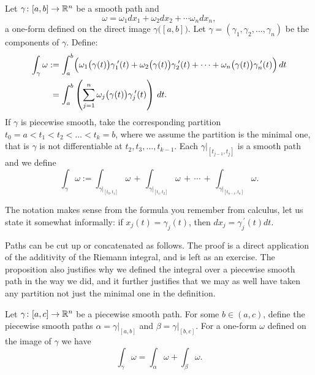 \begin{defn}
Let $\gamma \colon [a,b] \to {\mathbb{R}}^n$ be a smooth path
and
\begin{equation*}
\omega = \omega_1 dx_1 + \omega_2 dx_2 + \cdots \omega_n dx_n ,
\end{equation*}
a one-form defined on the direct image $\gamma\bigl([a,b]\bigr)$.
Let $\gamma = (\gamma_1,\gamma_2,\ldots,\gamma_n)$ be the components of
$\gamma$.
Define:
\begin{equation*}
\begin{split}
\int_{\gamma} \omega
& :=
\int_a^b 
\Bigl(
\omega_1\bigl(\gamma(t)\bigr) \gamma_1^{\:\prime}(t) +
\omega_2\bigl(\gamma(t)\bigr) \gamma_2^{\:\prime}(t) + \cdots +
\omega_n\bigl(\gamma(t)\bigr) \gamma_n^{\:\prime}(t) \Bigr) \, dt
\\
&\phantom{:}=
\int_a^b 
\left(
\sum_{j=1}^n
\omega_j\bigl(\gamma(t)\bigr) \gamma_j^{\:\prime}(t) \right) \, dt .
\end{split}
\end{equation*}
If $\gamma$ is piecewise smooth, take the corresponding partition
$t_0 = a < t_1 < t_2 < \ldots < t_k = b$, where we assume the partition is
the minimal one, that is $\gamma$ is not differentiable
at $t_2,t_3,\ldots,t_{k-1}$.  Each $\gamma|_{[t_{j-1},t_j]}$ is
a smooth path and we define
\begin{equation*}
\int_{\gamma} \omega
:=
\int_{\gamma|_{[t_0,t_1]}} \omega
\,
+
\,
\int_{\gamma|_{[t_1,t_2]}} \omega
\,
+ \, \cdots \, + \,
\int_{\gamma|_{[t_{n-1},t_n]}} \omega .
\end{equation*}
\end{defn}

The notation makes sense from the formula you remember from calculus,
let us state it somewhat informally:
if $x_j(t) = \gamma_j(t)$, then $dx_j = \gamma_j^{\:\prime}(t) dt$.

Paths can be cut up or concatenated as follows.  The proof is a direct application
of the additivity of the Riemann integral, and is left as an exercise.
The proposition also justifies why we defined the integral over a piecewise
smooth path in the way we did, and it further justifies that we may as well
have taken any partition not just the minimal one in the definition.

\begin{prop} \label{mv:prop:pathconcat}
Let $\gamma \colon [a,c] \to {\mathbb{R}}^n$ be a piecewise smooth path.
For some $b \in (a,c)$,
define the piecewise smooth paths
$\alpha = \gamma|_{[a,b]}$ and
$\beta = \gamma|_{[b,c]}$.
For a one-form $\omega$ defined on the image
of $\gamma$ we have
\begin{equation*}
\int_{\gamma} \omega =
\int_{\alpha} \omega +
\int_{\beta} \omega .
\end{equation*}
\end{prop}



